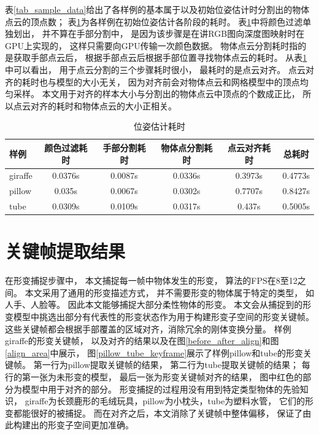 表\ref{tab_sample_data}给出了各样例的基本属于以及初始位姿估计时分割出的物体点云的顶点数；
表\ref{tab_est_pose_time}为各样例在初始位姿估计各阶段的耗时。
表\ref{tab_est_pose_time}中将颜色过滤单独划出，
并不算在手部分割中，
是因为该步骤是在讲RGB图向深度图映射时在GPU上实现的，
这样只需要向GPU传输一次颜色数据。
物体点云分割耗时指的是获取手部点云后，
根据手部点云后根据手部位置寻找物体点云的耗时。
从表\ref{tab_est_pose_time}中可以看出，
用于点云分割的三个步骤耗时很小，
最耗时的是点云对齐。
点云对齐的耗时也与模型的大小无关，
因为对齐前会对物体点云和网格模型中的顶点均匀采样。
本文用于对齐的样本大小与分割出的物体点云中顶点的个数成正比，
所以点云对齐的耗时和物体点云的大小正相关。
\begin{table}
    \caption{位姿估计耗时}
    \label{tab_est_pose_time} 
    \centering
    \begin{tabular}[t]{|l|c|c|c|c|c|}
        \hline
        样例        &   颜色过滤耗时   & 手部分割耗时    &   物体点分割耗时    & 点云对齐耗时    &   总耗时\\
        \hline
        giraffe    &    0.0376s       &  0.0087s       &    0.0336s         &   0.3973s     &   0.4773s\\
        \hline
        pillow     &    0.035s        &  0.0067s       &    0.0302s         &   0.7707s     &   0.8427s\\
        \hline
        tube       &    0.0309s       &  0.0109s       &    0.0317s         &   0.437s      &   0.5005s\\             
        \hline
    \end{tabular}
\end{table}
\section{关键帧提取结果}\label{sec_keyframe_res}
在形变捕捉步骤中，
本文捕捉每一帧中物体发生的形变，
算法的FPS在8至12之间。
本文采用了通用的形变描述方式，
并不需要形变的物体属于特定的类型，
如人手、人脸等。
因此本文能够捕捉大部分柔性物体的形变。
本文会从捕捉到的形变模型中挑选出部分有代表性的形变状态作为用于构建形变子空间的形变关键帧。
这些关键帧都会根据手部覆盖的区域对齐，消除冗余的刚体变换分量。
样例giraffe的形变关键帧，
以及对齐的结果以及在图\ref{before_after_align}和图\ref{align_area}中展示，
图\ref{pillow_tube_keyframe}展示了样例pillow和tube的形变关键帧。
第一行为pillow提取关键帧的结果，
第二行为tube提取关键帧的结果；
每行的第一张为未形变的模型，
最后一张为形变关键帧对齐的结果，
图中红色的部分为模型中用于对齐的部分。
形变捕捉的过程用没有用到特定类型物体的先验知识，
giraffe为长颈鹿形的毛绒玩具，pillow为小枕头，tube为塑料水管，
它们的形变都能很好的被捕捉。
而在对齐之后，本文消除了关键帧中整体偏移，
保证了由此构建出的形变子空间更加准确。

